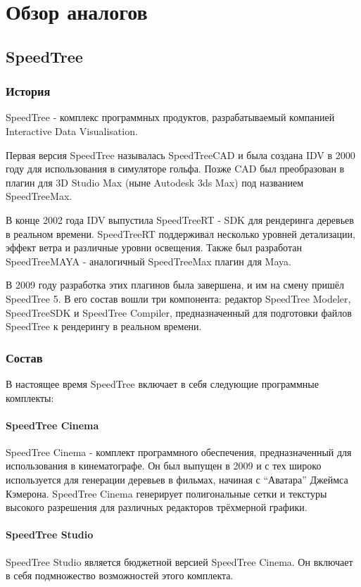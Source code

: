 \chapter{Обзор аналогов}
\section{SpeedTree}
\subsection{История}
SpeedTree - комплекс программных продуктов, разрабатываемый компанией Interactive Data Visualisation. 

Первая версия SpeedTree называлась SpeedTreeCAD и была создана IDV в 2000 году для использования в симуляторе гольфа. Позже CAD был преобразован в плагин для 3D Studio Max (ныне Autodesk 3ds Max) под названием SpeedTreeMax. 

В конце 2002 года IDV выпустила SpeedTreeRT - SDK для рендеринга деревьев в реальном времени. SpeedTreeRT поддерживал несколько уровней детализации, эффект ветра и различные уровни освещения. Также был разработан SpeedTreeMAYA - аналогичный SpeedTreeMax плагин для Maya. 

В 2009 году разработка этих плагинов была завершена, и им на смену пришёл SpeedTree 5. В его состав вошли три компонента: редактор SpeedTree Modeler, SpeedTreeSDK и SpeedTree Compiler, предназначенный для подготовки файлов SpeedTree к рендерингу в реальном времени. 

\subsection{Состав}
В настоящее время SpeedTree включает в себя следующие программные комплекты:
\subsubsection{SpeedTree Cinema}
SpeedTree Cinema - комплект программного обеспечения, предназначенный для использования в кинематографе. Он был выпущен в 2009 и с тех широко используется для генерации деревьев в фильмах, начиная с ``Аватара'' Джеймса Кэмерона. SpeedTree Cinema генерирует полигональные сетки и текстуры высокого разрешения для различных редакторов трёхмерной графики.

\subsubsection{SpeedTree Studio}
SpeedTree Studio является бюджетной версией SpeedTree Cinema. Он включает в себя подмножество возможностей этого комплекта.


